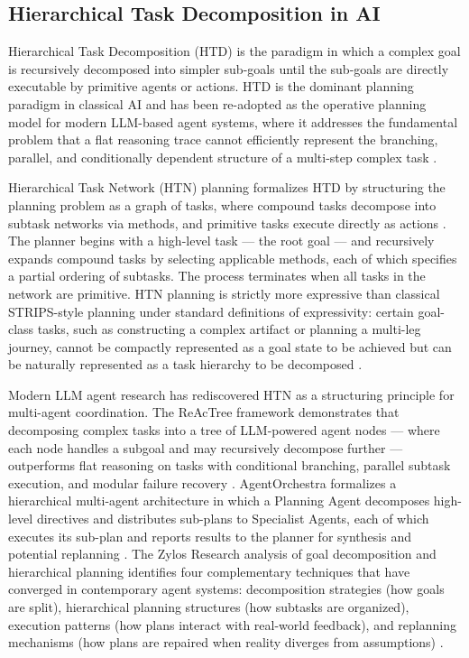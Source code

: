 \subsection{Hierarchical Task Decomposition in AI}
\label{sec:htn}

Hierarchical Task Decomposition (HTD) is the paradigm in which a complex goal is recursively decomposed into simpler sub-goals until the sub-goals are directly executable by primitive agents or actions. HTD is the dominant planning paradigm in classical AI \cite{erol1994umcp, georgievski2015htn} and has been re-adopted as the operative planning model for modern LLM-based agent systems, where it addresses the fundamental problem that a flat reasoning trace cannot efficiently represent the branching, parallel, and conditionally dependent structure of a multi-step complex task \cite{zylos-htn, agentorchestra, reagentree}.

Hierarchical Task Network (HTN) planning formalizes HTD by structuring the planning problem as a graph of tasks, where compound tasks decompose into subtask networks via methods, and primitive tasks execute directly as actions \cite{erol1994umcp, nau-htn-overview}. The planner begins with a high-level task — the root goal — and recursively expands compound tasks by selecting applicable methods, each of which specifies a partial ordering of subtasks. The process terminates when all tasks in the network are primitive. HTN planning is strictly more expressive than classical STRIPS-style planning under standard definitions of expressivity: certain goal-class tasks, such as constructing a complex artifact or planning a multi-leg journey, cannot be compactly represented as a goal state to be achieved but can be naturally represented as a task hierarchy to be decomposed \cite{erol1994semantics}.

Modern LLM agent research has rediscovered HTN as a structuring principle for multi-agent coordination. The ReAcTree framework demonstrates that decomposing complex tasks into a tree of LLM-powered agent nodes — where each node handles a subgoal and may recursively decompose further — outperforms flat reasoning on tasks with conditional branching, parallel subtask execution, and modular failure recovery \cite{reagentree}. AgentOrchestra formalizes a hierarchical multi-agent architecture in which a Planning Agent decomposes high-level directives and distributes sub-plans to Specialist Agents, each of which executes its sub-plan and reports results to the planner for synthesis and potential replanning \cite{agentorchestra}. The Zylos Research analysis of goal decomposition and hierarchical planning identifies four complementary techniques that have converged in contemporary agent systems: decomposition strategies (how goals are split), hierarchical planning structures (how subtasks are organized), execution patterns (how plans interact with real-world feedback), and replanning mechanisms (how plans are repaired when reality diverges from assumptions) \cite{zylos-htn}.

